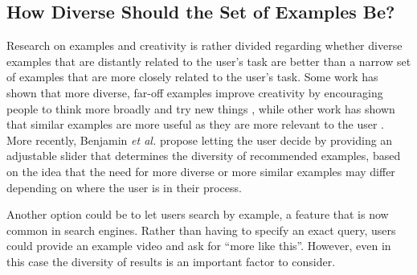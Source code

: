 \subsection{How Diverse Should the Set of Examples Be?}
Research on examples and creativity is rather divided regarding whether diverse examples that are distantly related to the user's task are better than a narrow set of examples that are more closely related to the user's task. Some work has shown that more diverse, far-off examples improve creativity by encouraging people to think more broadly and try new things \cite{Chan2011, Siangliulue2015a}, while other work has shown that similar examples are more useful as they are more relevant to the user \cite{Chan2015}. More recently, Benjamin \textit{et al.} \cite{Benjamin2014} propose letting the user decide by providing an adjustable slider that determines the diversity of recommended examples, based on the idea that the need for more diverse or more similar examples may differ depending on where the user is in their process.

Another option could be to let users search by example, a feature that is now common in search engines. Rather than having to specify an exact query, users could provide an example video and ask for ``more like this''. However, even in this case the diversity of results is an important factor to consider.


